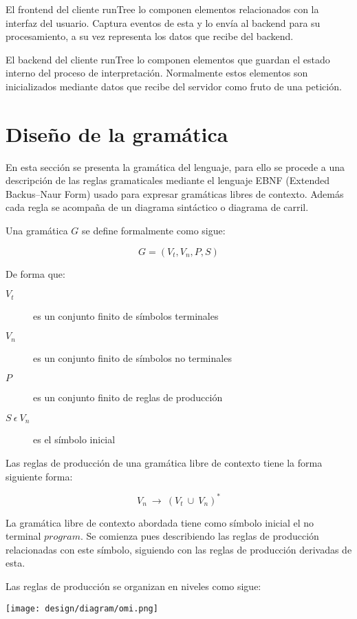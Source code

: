 El frontend del cliente runTree lo componen elementos relacionados con la interfaz del usuario. Captura eventos de esta y lo envía al backend para su procesamiento, a su vez representa los datos que recibe del backend. 

El backend del cliente runTree lo componen elementos que guardan el estado interno del proceso de interpretación. Normalmente estos elementos son inicializados mediante datos que recibe del servidor como fruto de 
una petición.


\section{Diseño de la gramática}
En esta sección se presenta la gramática del lenguaje, para ello 
se procede a una descripción de las reglas gramaticales
 mediante el lenguaje EBNF (Extended Backus–Naur Form) 
usado para expresar gramáticas libres de contexto. Además cada regla se acompaña de un
diagrama sintáctico o diagrama de carril. 

Una gramática $G$ se define formalmente como sigue:

$$G = (V_t,V_n, P, S)$$

De forma que:

\begin{description}
\item[$V_t$] es un conjunto finito de símbolos terminales
\item[$V_n$] es un conjunto finito de símbolos no terminales
\item[$P$] es un conjunto finito de reglas de producción
\item[$S\ \epsilon\ V_n$] es el símbolo inicial
\end{description}

Las reglas de producción de una gramática libre de contexto tiene la forma siguiente forma:

$$V_n\ \rightarrow\ (V_t\ \cup\ V_n)^*$$ 

La gramática libre de contexto abordada tiene como símbolo inicial 
el no terminal $program$. Se comienza pues describiendo las reglas de producción 
relacionadas con este símbolo, siguiendo con las reglas de producción derivadas 
de esta. 

Las reglas de producción se organizan en niveles como sigue:

\begin{center}
\texttt{[image: design/diagram/omi.png]} 
\end{center}

